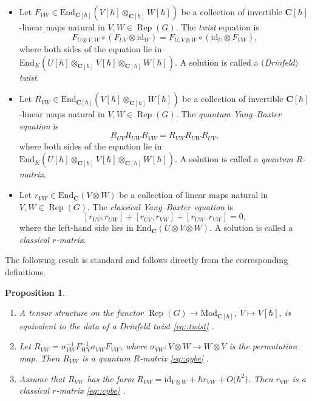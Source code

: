 \documentclass[10pt,a4paper]{article}
\numberwithin{equation}{section}
\newtheorem{Proposition}[Theorem]{Proposition}
{ \theoremstyle{definition}
	\newtheorem{Definition}[Theorem]{Definition}
	\newtheorem{Note}[Theorem]{Note}
	\newtheorem{Example}[Theorem]{Example}
	\newtheorem{Remark}[Theorem]{Remark} }
\newcommand{\C}{\mathbf{C}}
\newcommand{\Mod}[1]{{\mathrm{Mod}}_{#1}}
\newcommand{\End}{\mathrm{End}}
\newcommand{\id}{\mathrm{id}}
\DeclareMathOperator{\Rep}{Rep}
\begin{document}
	\begin{Definition}
		\label{def::all_constant}\qquad
		\begin{itemize}\itemsep=0pt
			\item Let $F_{VW} \in \End_{\C[\hbar]}(V[\hbar]\otimes_{\C[\hbar]} W[\hbar]) $ be a collection of invertible $\C[\hbar]$-linear maps natural in $V,W\in \Rep(G)$. The \emph{twist} equation is
			\begin{equation}
				\label{eq::twist}
				F_{U \otimes V,W} \circ (F_{UV} \otimes \id_W) = F_{U,V\otimes W} \circ (\id_U \otimes F_{VW}),
			\end{equation}
			where both sides of the equation lie in $\End_K(U[\hbar] \otimes_{\C[\hbar]} V[\hbar] \otimes_{\C[\hbar]} W[\hbar])$. A solution is called a \emph{$($Drinfeld$)$ twist}.
			\item Let $R_{VW}\in \End_{\C[\hbar]}(V[\hbar]\otimes_{\C[\hbar]} W[\hbar]) $ be a collection of invertible $\C[\hbar]$-linear maps natural in $V,W\in \Rep(G)$. The \emph{quantum Yang--Baxter equation} is
			\begin{equation}
				\label{eq::qybe}
				R_{UV} R_{UW} R_{VW} = R_{VW} R_{UW} R_{UV},
			\end{equation}
			where both sides of the equation lie in $\End_K(U[\hbar] \otimes_{\C[\hbar]} V[\hbar] \otimes_{\C[\hbar]} W[\hbar])$. A solution is called a \emph{quantum $R$-matrix}.
			\item Let $r_{VW}\in \End_{\C}(V\otimes W) $ be a collection of linear maps natural in $V,W\in \Rep(G)$. The \emph{classical Yang--Baxter equation} is
			\begin{equation}
				\label{eq::cybe}
				[r_{UV},r_{UW}] + [r_{UV},r_{VW}] + [r_{UW}, r_{VW}] = 0,
			\end{equation}
			where the left-hand side lies in $\End_{\C}(U \otimes V \otimes W)$. A solution is called a \emph{classical $r$-matrix}.
		\end{itemize}
	\end{Definition}
	
	The following result is standard and follows directly from the corresponding definitions.
	\begin{Proposition}\qquad
		\begin{enumerate}\itemsep=0pt
			\item[$(1)$] A tensor structure on the functor
$
			\Rep(G) \rightarrow \Mod{\C[\hbar]}$, $ V \mapsto V[\hbar]$,
			is equivalent to the data of a Drinfeld twist \eqref{eq::twist} {\rm\cite[\emph{Definition} 2.4.1]{EGNO}}.
			\item[$(2)$] Let $R_{VW} = \sigma_{VW}^{-1} F_{WV}^{-1} \sigma_{VW} F_{VW}$, where $\sigma_{VW} \colon V \otimes W \rightarrow W \otimes V$ is the permutation map. Then $R_{VW}$ is a quantum $R$-matrix \eqref{eq::qybe} {\rm\cite[\emph{Definition} 8.1.1]{EGNO}}.
			\item[$(3)$] Assume that $R_{VW}$ has the form $R_{VW} = \id_{V \otimes W} + \hbar r_{VW} + O\bigl(\hbar^2\bigr)$. Then $r_{VW}$ is a classical $r$-matrix \eqref{eq::cybe} {\rm\cite[\emph{Proposition} 9.4]{EtingofSchiffmannQuantumGroups}}.
		\end{enumerate}
	\end{Proposition}
	
\end{document}
